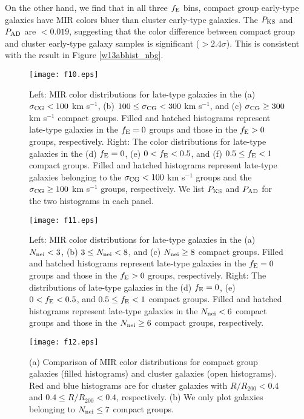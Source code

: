 \documentclass[12pt,preprint,apj]{emulateapj}
\newcommand{\efrac}{f_{\rm E}}
\newcommand{\nbg}{N_{\rm nei}}
\begin{document}
On the other hand, we find that in all three $\efrac$ bins,
compact group early-type galaxies have MIR colors bluer than 
cluster early-type galaxies.
The $P_{\rm KS}$ and $P_{\rm AD}$ are $<0.019$, suggesting that 
the color difference between compact group and cluster early-type galaxy samples
is significant ($>2.4\sigma$).
This is consistent with the result in Figure \ref{w13abhist_nbg}.

\begin{figure*}[h]
\centering
\texttt{[image: f10.eps]}
\caption{
Left: MIR color distributions for late-type galaxies 
in the (a) $\sigma_{\rm CG}<100$ km s$^{-1}$, 
(b) $100\leq\sigma_{\rm CG}<300$ km s$^{-1}$, 
and (c) $\sigma_{\rm CG}\geq300$ km s$^{-1}$ compact groups. 
Filled and hatched histograms represent late-type galaxies in the $\efrac=0$ groups 
and those in the $\efrac>0$ groups, respectively. 
Right: The color distributions for late-type galaxies in the (d) $\efrac=0$, 
(e) $0<\efrac<0.5$, and (f) $0.5\leq\efrac<1$ compact groups. 
Filled and hatched histograms represent late-type galaxies 
belonging to the $\sigma_{\rm CG}<100$ km s$^{-1}$ groups
and the $\sigma_{\rm CG}\geq100$ km s$^{-1}$ groups, respectively.
We list $P_{\rm KS}$ and $P_{\rm AD}$ for the two histograms in each panel.
}
\label{w13abhist_vdisp_efrac}
\end{figure*}

\begin{figure*}
\centering
\texttt{[image: f11.eps]}
\caption{
Left: MIR color distributions for late-type galaxies in the (a) $\nbg<3$, 
(b) $3\leq\nbg<8$, and (c) $\nbg\geq8$ compact groups. 
Filled and hatched histograms represent late-type galaxies in the $\efrac=0$ groups 
and those in the $\efrac>0$ groups, respectively. 
Right: The distributions of late-type galaxies in the (d) $\efrac=0$, 
(e) $0<\efrac<0.5$, and $0.5\leq\efrac<1$ compact groups. 
Filled and hatched histograms represent late-type galaxies 
in the $\nbg<6$ compact groups and those in the $\nbg\geq6$ compact groups,
respectively. 
}
\label{w13abhist_nbg_efrac_lgal}
\end{figure*}

\begin{figure}
\centering
\texttt{[image: f12.eps]}
\caption{(a) Comparison of MIR color distributions for compact group galaxies (filled 
histograms) and cluster galaxies (open histograms). 
Red and blue histograms are for cluster galaxies with $R/R_{200}<0.4$
and $0.4\leq R/R_{200} < 0.4$, respectively.
(b) We only plot galaxies belonging to $\nbg\leq7$ compact groups.
}
\label{comp_w13abhist_cluster}
\end{figure}
\end{document}
